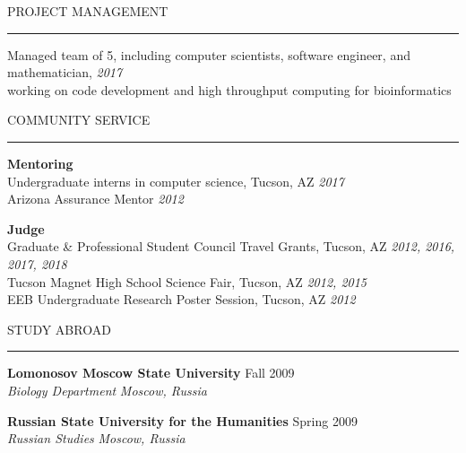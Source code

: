 \documentclass{resume} %
\renewenvironment{rSection}[1]{
\sectionskip
\textcolor{RoyalPurple}{\MakeUppercase{#1}}
\sectionlineskip
\hrule
\begin{list}{}{
\setlength{\leftmargin}{1.5em}
}
\item[]
}{
\end{list}
}
\begin{document}

\begin{rSection}{Project Management}

    Managed team of 5, including computer scientists, software engineer, and mathematician, \hfill {\em 2017}\\ 
    working on code development and high throughput computing for bioinformatics
    
    \end{rSection}


\begin{rSection}{Community Service}

    \textbf{Mentoring}\\
    Undergraduate interns in computer science, Tucson, AZ \hfill {\em 2017}\\
    Arizona Assurance Mentor \hfill {\em 2012}
    
    \textbf{Judge}\\
    Graduate \& Professional Student Council Travel Grants, Tucson, AZ \hfill {\em 2012, 2016, 2017, 2018}\\
    Tucson Magnet High School Science Fair, Tucson, AZ \hfill {\em 2012, 2015}\\
    EEB Undergraduate Research Poster Session, Tucson, AZ \hfill {\em 2012}
    
    \end{rSection}


\begin{rSection}{Study Abroad}

{\bf Lomonosov Moscow State University} \hfill Fall 2009 \\ 
{\em Biology Department} \hfill {\em Moscow, Russia}

{\bf Russian State University for the Humanities} \hfill Spring 2009 \\ 
{\em Russian Studies} \hfill {\em Moscow, Russia}

\end{rSection}
\end{document}
